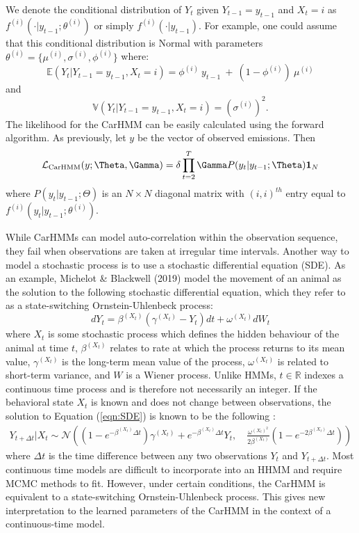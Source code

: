 %
We denote the conditional distribution of $Y_t$ given $Y_{t-1}= y_{t-1}$ and $ X_t=i$ as $f^{(i)}( \cdot | y_{t-1}; \theta^{(i)})$ or simply $f^{(i)}( \cdot | y_{t-1})$.
For example, one could assume that this conditional distribution is Normal with parameters $\theta^{(i)} = \{\mu^{(i)},\sigma^{(i)},\phi^{(i)}\}$ where:
%
\[
\mathbb{E}(Y_t|Y_{t-1} = y_{t-1},X_t=i) = \phi^{(i)} ~ y_{t-1} ~+ ~(1-\phi^{(i)})  ~\mu^{(i)}
\]
and
\[
\mathbb{V}(Y_t| Y_{t-1} =y_{t-1}, X_t = i) = (\sigma^{(i)})^2.
\]
%
The likelihood for the CarHMM can be easily calculated using the forward algorithm. As previously, let $y$ be the vector of observed emissions. Then
\begin{equation}
    \calL_{\text{CarHMM}}(y;\Theta,\Gamma) = \delta \prod_{t=2}^T \Gamma P(y_t|y_{t-1};\Theta) \mathbf{1}_N
    \label{CarHMM_likelihood}
\end{equation}
where
%
$P(y_t|y_{t-1};\Theta)$ is an $N \times N$ diagonal matrix with $(i,i)^{th}$ entry equal to $f^{(i)}(y_t|y_{t-1}; \theta^{(i)})$.

While CarHMMs can model auto-correlation within the observation sequence, they fail when observations are taken at irregular time intervals. Another way to model a stochastic process is to use a stochastic differential equation (SDE). As an example, Michelot \& Blackwell (2019) model the movement of an animal as the solution to the following stochastic differential equation, which they refer to as a state-switching Ornstein-Uhlenbeck process:
%
\begin{equation}
    \label{eqn:SDE}
    dY_t = \beta^{(X_t)}(\gamma^{(X_t)} - Y_t)dt + \omega^{(X_t)} dW_t
\end{equation}
%
where $X_t$ is some stochastic process which defines the hidden behaviour of the animal at time $t$, $\beta^{(X_t)}$ relates to rate at which the process returns to its mean value, $\gamma^{(X_t)}$ is the long-term mean value of the process, $\omega^{(X_t)}$ is related to short-term variance, and $W$ is a Wiener process. Unlike HMMs, $t \in \mathbb{R}$ indexes a continuous time process and is therefore not necessarily an integer. If the behavioral state $X_t$ is known and does not change between observations, the solution to Equation (\ref{eqn:SDE}) is known to be the following \citep{Michelot:2019}:
%
\begin{align}
    Y_{t+\Delta t} | X_{t} \sim \mathcal{N}\left((1-e^{-\beta^{(X_t)}\Delta t})\gamma^{(X_t)} + e^{-\beta^{(X_t)}\Delta t} Y_t,\quad \frac{\omega^{(X_t)^2}}{2\beta^{(X_t)}} (1-e^{-2\beta^{(X_t)}\Delta t})\right)
    \label{eqn:OU_sol}
\end{align}
%
where $\Delta t$ is the time difference between any two observations $Y_t$ and $Y_{t+\Delta t}$. Most continuous time models are difficult to incorporate into an HHMM and require MCMC methods to fit. However, under certain conditions, the CarHMM is equivalent to a state-switching Ornstein-Uhlenbeck process. This gives new interpretation to the learned parameters of the CarHMM in the context of a continuous-time model.

